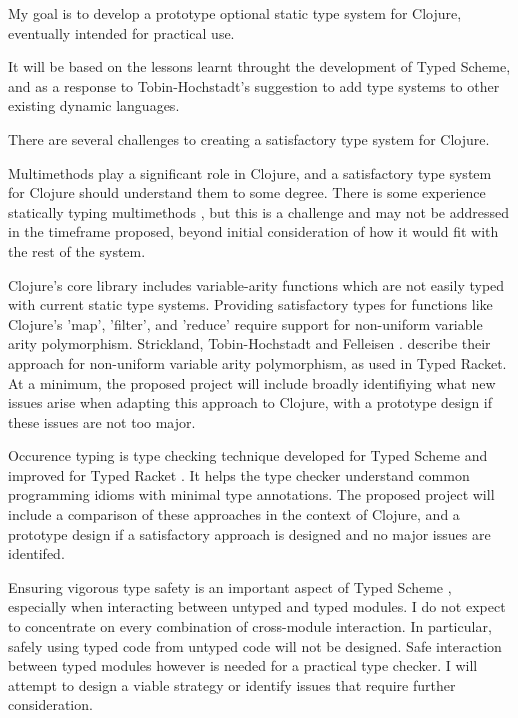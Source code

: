 \documentclass[12pt, a4paper]{article}
\begin{document}
My goal is to develop a prototype optional static type system for Clojure, 
eventually intended for practical use.

It will be based on the lessons learnt throught the development
of Typed Scheme, and as a response to Tobin-Hochstadt's \cite{TypedScheme:2010}
suggestion to add type systems to other existing dynamic languages.

There are several challenges to creating a satisfactory type system for Clojure.

Multimethods play a significant role in Clojure, and a satisfactory
type system for Clojure should understand them to some degree.
There is some experience statically typing multimethods
\cite{Millstein02modularstatically}
, but this is a challenge and may not be addressed in the
timeframe proposed, beyond initial consideration of how it would
fit with the rest of the system.

Clojure's core library includes variable-arity functions which
are not easily typed with current static type systems. 
Providing satisfactory types for functions 
like Clojure's 'map', 'filter', and 'reduce' require
support for non-uniform variable arity polymorphism. 
Strickland, Tobin-Hochstadt and Felleisen \cite{Strickland:2009:PVP:1532974.1532978}.
describe their approach for non-uniform variable arity polymorphism, as used
in Typed Racket. 
At a minimum, the proposed project will include broadly identifiying 
what new issues arise when adapting this approach to Clojure, 
with a prototype design if these issues are not too major.

Occurence typing is type checking technique developed for Typed Scheme 
\cite{Tobin-Hochstadt:2008:DIT:1328897.1328486}
and improved for Typed Racket
\cite{Tobin-Hochstadt:2010:LTU:1932681.1863561}.
It helps the type checker understand common programming idioms 
with minimal type annotations.
The proposed project will include a comparison of these approaches in
the context of Clojure, and a prototype design if a satisfactory approach 
is designed and no major issues are identifed.

Ensuring vigorous type safety is an important aspect of Typed Scheme 
\cite{TypedScheme:2010} ,
especially when interacting between untyped and typed modules.
I do not expect to concentrate on every combination of cross-module
interaction. In particular, safely using typed code from untyped code
will not be designed. Safe interaction between typed modules
however is needed for a practical type checker. I
will attempt to design a viable strategy or identify issues that
require further consideration.
\end{document}
